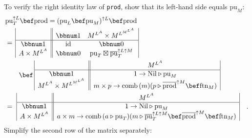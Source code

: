 To verify the right identity law of \lstinline!prod!, show that its
left-hand side equals $\text{pu}_{M}$:
\begin{align*}
 & \text{pu}_{T}^{\uparrow L}\bef\text{prod}=(\text{pu}_{L}\bef\text{pu}_{M})^{\uparrow L}\bef\text{prod}\\
 & =\,\begin{array}{|c||cc|}
 & \bbnum 1 & M^{L^{A}}\times M^{L^{M^{L^{A}}}}\\
\hline \bbnum 1 & \text{id} & \bbnum 0\\
A\times M^{L^{A}} & \bbnum 0 & \text{pu}_{T}\boxtimes\overline{\text{pu}}_{T}^{\uparrow L\uparrow M}
\end{array}\\
 & \quad\quad\bef\,\begin{array}{|c||c|}
 & M^{L^{A}}\\
\hline \bbnum 1 & 1\rightarrow\text{Nil}\triangleright\text{pu}_{M}\\
M^{L^{A}}\times M^{L^{M^{L^{A}}}} & m\times p\rightarrow\text{comb}\,(m)(p\triangleright\overline{\text{prod}}^{\uparrow M}\bef\text{ftn}_{M})
\end{array}\\
 & =\,\,\begin{array}{|c||c|}
 & M^{L^{A}}\\
\hline \bbnum 1 & 1\rightarrow\text{Nil}\triangleright\text{pu}_{M}\\
A\times M^{L^{A}} & a\times m\rightarrow\text{comb}\,(a\triangleright\text{pu}_{T})(m\triangleright\overline{\text{pu}}_{T}^{\uparrow L\uparrow M}\bef\overline{\text{prod}}^{\uparrow M}\bef\text{ftn}_{M})
\end{array}\quad.
\end{align*}
Simplify the second row of the matrix separately:
